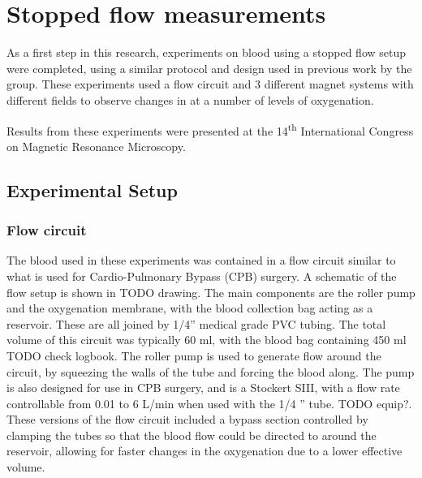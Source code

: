 \chapter{Stopped flow \SOtwo measurements}\label{ch:stoppedflow}

As a first step in this research, experiments on blood using a stopped flow setup were completed, using a similar protocol and design used in previous work by the group.
These experiments used a flow circuit and 3 different magnet systems with different fields to observe changes in \Ttwo at a number of levels of oxygenation.

Results from these experiments were presented at the 14\textsuperscript{th} International Congress on Magnetic Resonance Microscopy.

\section{Experimental Setup}

\subsection{Flow circuit}
The blood used in these experiments was contained in a flow circuit similar to what is used for Cardio-Pulmonary Bypass (CPB) surgery.
A schematic of the flow setup is shown in TODO drawing.
The main components are the roller pump and the oxygenation membrane, with the blood collection bag acting as a reservoir.
These are all joined by 1/4'' medical grade PVC tubing.
The total volume of this circuit was typically 60 ml, with the blood bag containing 450 ml TODO check logbook.
The roller pump is used to generate flow around the circuit, by squeezing the walls of the tube and forcing the blood along.
The pump is also designed for use in CPB surgery, and is a Stockert SIII, with a flow rate controllable from 0.01 to 6 L/min when used with the 1/4 '' tube. TODO equip?.
These versions of the flow circuit included a bypass section controlled by clamping the tubes so that the blood flow could be directed to around the reservoir, allowing for faster changes in the oxygenation due to a lower effective volume.


